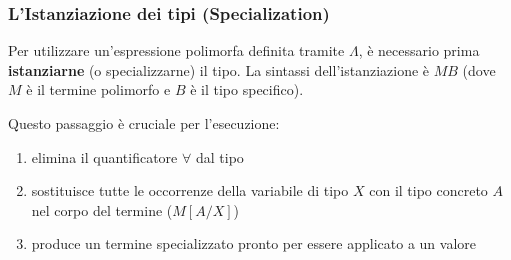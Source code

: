 \documentclass[a4paper,11pt]{report}
\begin{document}
\subsubsection{L'Istanziazione dei tipi (Specialization)}
Per utilizzare un'espressione polimorfa definita tramite $\Lambda$, è necessario prima \textbf{istanziarne} (o specializzarne) il tipo.
La sintassi dell'istanziazione è \( M B \) (dove \( M \) è il termine polimorfo e \( B \) è il tipo specifico).

Questo passaggio è cruciale per l'esecuzione:
\begin{enumerate}
    \item elimina il quantificatore \( \forall \) dal tipo
    \item sostituisce tutte le occorrenze della variabile di tipo \( X \) con il tipo concreto \( A \) nel corpo del termine ($M[A/X]$)
    \item produce un termine specializzato pronto per essere applicato a un valore
\end{enumerate}
\end{document}
